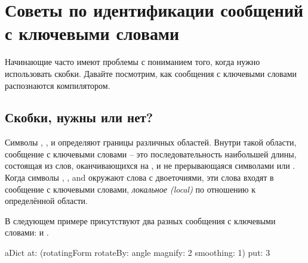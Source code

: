 \documentclass[a4paper,10pt,twoside]{book}
\begin{document}
\section{Советы по идентификации сообщений с ключевыми словами}
Начинающие часто имеют проблемы с пониманием того, когда нужно использовать скобки. Давайте посмотрим, как сообщения с ключевыми словами распознаются компилятором.

\subsection{Скобки, нужны или нет?}
Символы \ct{[}, \ct{]}, \ct{(} и \ct{)} 
определяют границы различных областей. Внутри такой области, сообщение с ключевыми словами -- это последовательность наибольшей длины, состоящая из слов, оканчивающихся на \ct{:}, и не прерывающаяся символами  или \ct{;}. 
Когда символы \ct{[}, \ct{]}, \ct{(} and \ct{)} окружают слова с двоеточиями, эти слова входят в сообщение с ключевыми словами, \emph{локальное (local)} по отношению к определённой области.

В следующем примере присутствуют два разных сообщения с ключевыми словами:  и .

\begin{code}{}
aDict
   at: (rotatingForm 
          rotateBy: angle	
          magnify: 2 
          smoothing: 1)
   put: 3
\end{code}

\important{
Символы \lct{[}, \lct{]}, \lct{(} и \lct{)} определяют границы различных областей. Внутри такой области
сообщение с ключевыми словами определяется как последовательность наибольшей длины, состоящая из слов, завершающихся двоеточием, и не прерываемая символами \lct{.} или \lct{;}.
Когда символы \lct{[}, \lct{]}, \lct{(} и \lct{)} окружают слова с двоеточиями, эти слова входят в сообщение с ключевыми словами, локальное для данной области.}
\end{document}
